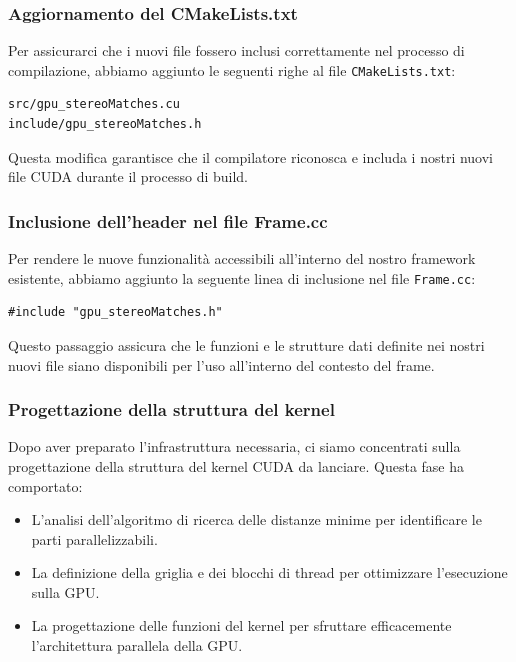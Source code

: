\documentclass[12pt,a4paper]{report}
\begin{document}
\subsubsection{Aggiornamento del CMakeLists.txt}

Per assicurarci che i nuovi file fossero inclusi correttamente nel processo di compilazione, abbiamo aggiunto le seguenti righe al file \texttt{CMakeLists.txt}:

\begin{verbatim}
src/gpu_stereoMatches.cu
include/gpu_stereoMatches.h
\end{verbatim}

Questa modifica garantisce che il compilatore riconosca e includa i nostri nuovi file CUDA durante il processo di build.

\subsubsection{Inclusione dell'header nel file Frame.cc}
Per rendere le nuove funzionalità accessibili all'interno del nostro framework esistente, abbiamo aggiunto la seguente linea di inclusione nel file \texttt{Frame.cc}:

\begin{verbatim}
#include "gpu_stereoMatches.h"
\end{verbatim}

Questo passaggio assicura che le funzioni e le strutture dati definite nei nostri nuovi file siano disponibili per l'uso all'interno del contesto del frame.

\subsubsection{Progettazione della struttura del kernel}
Dopo aver preparato l'infrastruttura necessaria, ci siamo concentrati sulla progettazione della struttura del kernel CUDA da lanciare. Questa fase ha comportato:

\begin{itemize}
\item L'analisi dell'algoritmo di ricerca delle distanze minime per identificare le parti parallelizzabili.
\item La definizione della griglia e dei blocchi di thread per ottimizzare l'esecuzione sulla GPU.
\item La progettazione delle funzioni del kernel per sfruttare efficacemente l'architettura parallela della GPU.
\end{itemize}
\end{document}
